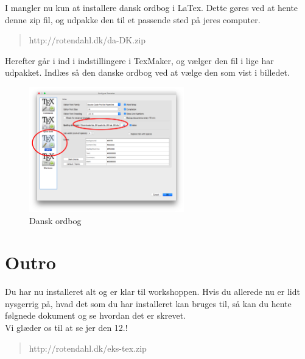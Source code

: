 \documentclass{article}                                                        %
\begin{document}
	I mangler nu kun at installere dansk ordbog i LaTex.
	Dette gøres ved at hente denne zip fil, og udpakke den til et passende sted
	på jeres computer.
	\begin{quote}
			http://rotendahl.dk/da-DK.zip
	\end{quote}
	
	Herefter går i ind i indstillingere i TexMaker, og vælger den fil i
	lige har udpakket.
	Indlæs så den danske ordbog ved at vælge den som vist i billedet.
	\begin{figure}[h!]
    	\caption{Dansk ordbog}
        \centering
        \includegraphics[width=0.6\textwidth]{./danish.png}
    \end{figure}

	\section{Outro}
	Du har nu installeret alt og er klar til workshoppen.
	Hvis du allerede nu er lidt nysgerrig på, hvad det som du har installeret
	kan bruges til, så kan du hente følgnede dokument og se hvordan det er
	skrevet.
    \\ Vi glæder os til at se jer den 12.!
	\begin{quote}
		http://rotendahl.dk/eks-tex.zip	
	\end{quote}
	
\end{document}
